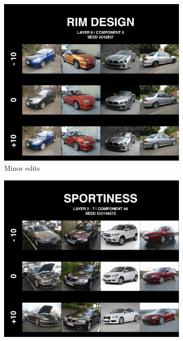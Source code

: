 \begin{figure}
\centering
\begin{subfigure}{.3\textwidth}
  \centering
  \includegraphics[width=\textwidth]{images/rim_design.pdf}
  \caption{Minor edits}
  \label{fig:rimdesign}
\end{subfigure}%
\hspace{.02\textwidth}
\begin{subfigure}{.3\textwidth}
  \centering
  \includegraphics[width=\textwidth]{images/Sportiness.pdf}

\end{subfigure}
\end{figure}
